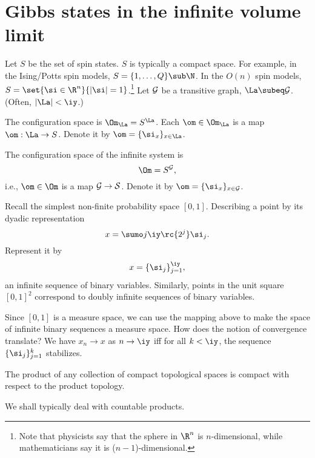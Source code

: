 
\section{Gibbs states in the infinite volume limit}

Let $S$ be the set of spin states. $S$ is typically a compact space. For example, in the Ising/Potts spin models, $S=\{1,\ldots, Q\}\sub\N$. In the $O(n)$ spin models, $S=\set{\si\in \R^n}{|\si|=1}$.\footnote{Note that physicists say that the sphere in $\R^n$ is $n$-dimensional, while mathematicians say it is ($n-1$)-dimensional.} Let $\cal G$ be a transitive graph, $\La\subeq\cal G$. (Often, $|\La|<\iy$.)

The configuration space is $\Om_{\La}=S^{\La}$. Each $\om\in \Om_{\La}$ is a map $\om:\La\to S$. Denote it by $\om=\{\si_x\}_{x\in \La}$.

The configuration space of the infinite system is 
\[
\Om=S^{\cal G},
\]
i.e., $\om\in \Om$ is a map $\cal G\to S$. Denote it by $\om=\{\si_x\}_{x\in \cal G}$.

Recall the simplest non-finite probability space $[0,1]$. 
Describing a point by its dyadic representation
\[
x=\sumo j{\iy} \rc{2^j}\si_j.
\]
Represent it by 
\[
x=\{\si_j\}_{j=1}^{\iy},
\]
an infinite sequence of binary variables. Similarly, points in the unit square $[0,1]^2$ correspond to doubly infinite sequences of binary variables.

Since $[0,1]$ is a measure space, we can use the mapping above to make the space of infinite binary sequences a measure space. How does the notion of convergence translate? We have $x_n\to x$ as $n\to \iy$ iff for all $k<\iy$, the sequence $\{\si_{j}\}_{j=1}^k$ stabilizes.

\begin{thm}
The product of any collection of compact topological spaces is compact with respect to the product topology. 
\end{thm}


We shall typically deal with countable products.

